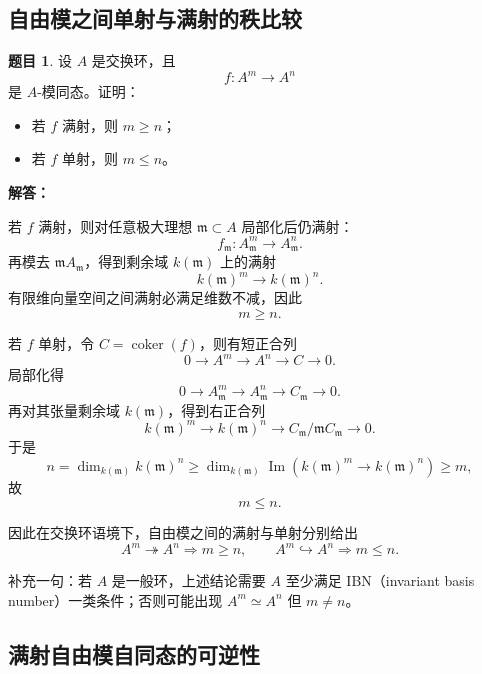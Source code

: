 \documentclass[a4paper]{ctexart}
\theoremstyle{definition}
\newtheorem{example}{题目}[section]
\theoremstyle{analysis}
\theoremstyle{plain}
\begin{document}
\subsection{\texorpdfstring{自由模之间单射与满射的秩比较}{自由模之间单射与满射的秩比较}}\label{subsec:problem-free-rank-comparison}

\begin{example}
设 \(A\) 是交换环，且
\[
  f:A^m\to A^n
\]
是 \(A\)-模同态。证明：
\begin{itemize}
  \item 若 \(f\) 满射，则 \(m\ge n\)；
  \item 若 \(f\) 单射，则 \(m\le n\)。
\end{itemize}

\textbf{解答：}

若 \(f\) 满射，则对任意极大理想 \(\mathfrak m\subset A\) 局部化后仍满射：
\[
  f_{\mathfrak m}:A_{\mathfrak m}^m\to A_{\mathfrak m}^n.
\]
再模去 \(\mathfrak mA_{\mathfrak m}\)，得到剩余域 \(k(\mathfrak m)\) 上的满射
\[
  k(\mathfrak m)^m\to k(\mathfrak m)^n.
\]
有限维向量空间之间满射必满足维数不减，因此
\[
  m\ge n.
\]

若 \(f\) 单射，令 \(C=\operatorname{coker}(f)\)，则有短正合列
\[
  0\to A^m\to A^n\to C\to 0.
\]
局部化得
\[
  0\to A_{\mathfrak m}^m\to A_{\mathfrak m}^n\to C_{\mathfrak m}\to 0.
\]
再对其张量剩余域 \(k(\mathfrak m)\)，得到右正合列
\[
  k(\mathfrak m)^m\to k(\mathfrak m)^n\to C_{\mathfrak m}/\mathfrak m C_{\mathfrak m}\to 0.
\]
于是
\[
  n
  =
  \dim_{k(\mathfrak m)} k(\mathfrak m)^n
  \ge
  \dim_{k(\mathfrak m)} \operatorname{Im}(k(\mathfrak m)^m\to k(\mathfrak m)^n)
  \ge m,
\]
故
\[
  m\le n.
\]

因此在交换环语境下，自由模之间的满射与单射分别给出
\[
  A^m\twoheadrightarrow A^n \Rightarrow m\ge n,
  \qquad
  A^m\hookrightarrow A^n \Rightarrow m\le n.
\]

补充一句：若 \(A\) 是一般环，上述结论需要 \(A\) 至少满足 IBN（invariant basis number）一类条件；否则可能出现 \(A^m\simeq A^n\) 但 \(m\ne n\)。
\end{example}

\subsection{满射自由模自同态的可逆性}
\label{subsec:problem-surjective-free-endomorphism}
\end{document}
